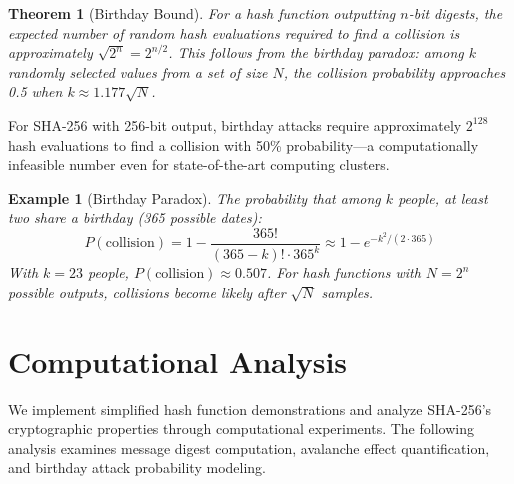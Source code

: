 \documentclass[a4paper, 11pt]{article}
\newtheorem{theorem}{Theorem}[section]
\newtheorem{example}{Example}[section]
\begin{document}
\begin{theorem}[Birthday Bound]
For a hash function outputting $n$-bit digests, the expected number of random hash evaluations
required to find a collision is approximately $\sqrt{2^n} = 2^{n/2}$. This follows from the
birthday paradox: among $k$ randomly selected values from a set of size $N$, the collision
probability approaches 0.5 when $k \approx 1.177\sqrt{N}$.
\end{theorem}

For SHA-256 with 256-bit output, birthday attacks require approximately $2^{128}$ hash
evaluations to find a collision with 50\% probability—a computationally infeasible number
even for state-of-the-art computing clusters.

\begin{example}[Birthday Paradox]
The probability that among $k$ people, at least two share a birthday (365 possible dates):
\begin{equation}
P(\text{collision}) = 1 - \frac{365!}{(365-k)! \cdot 365^k} \approx 1 - e^{-k^2/(2 \cdot 365)}
\end{equation}
With $k = 23$ people, $P(\text{collision}) \approx 0.507$. For hash functions with $N = 2^n$
possible outputs, collisions become likely after $\sqrt{N}$ samples.
\end{example}

\section{Computational Analysis}

We implement simplified hash function demonstrations and analyze SHA-256's cryptographic
properties through computational experiments. The following analysis examines message digest
computation, avalanche effect quantification, and birthday attack probability modeling.
\end{document}
